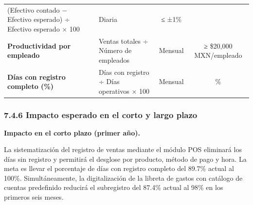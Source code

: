 \documentclass[
  12pt,
  spanish,
]{article}
\begin{document}
\begin{longtable}[]{@{}llcc@{}}
\begin{minipage}[t]{0.17\columnwidth}
(Efectivo contado − Efectivo esperado) ÷ Efectivo esperado × 100\strut
\end{minipage} & \begin{minipage}[t]{0.28\columnwidth}\centering
Diaria\strut
\end{minipage} & \begin{minipage}[t]{0.28\columnwidth}\centering
≤ ±1\%\strut
\end{minipage}\tabularnewline
\begin{minipage}[t]{0.17\columnwidth}\raggedright
\textbf{Productividad por empleado}\strut
\end{minipage} & \begin{minipage}[t]{0.17\columnwidth}\raggedright
Ventas totales ÷ Número de empleados\strut
\end{minipage} & \begin{minipage}[t]{0.28\columnwidth}\centering
Mensual\strut
\end{minipage} & \begin{minipage}[t]{0.28\columnwidth}\centering
≥ \$20,000 MXN/empleado\strut
\end{minipage}\tabularnewline
\begin{minipage}[t]{0.17\columnwidth}\raggedright
\textbf{Días con registro completo (\%)}\strut
\end{minipage} & \begin{minipage}[t]{0.17\columnwidth}\raggedright
Días con registro ÷ Días operativos × 100\strut
\end{minipage} & \begin{minipage}[t]{0.28\columnwidth}\centering
Mensual\strut
\end{minipage} & \begin{minipage}[t]{0.28\columnwidth}\centering
100\%\strut
\end{minipage}\tabularnewline
\bottomrule
\end{longtable}

\hypertarget{impacto-esperado-en-el-corto-y-largo-plazo}{%
\subsubsection{7.4.6 Impacto esperado en el corto y largo
plazo}\label{impacto-esperado-en-el-corto-y-largo-plazo}}

\textbf{Impacto en el corto plazo (primer año).}

La sistematización del registro de ventas mediante el módulo POS
eliminará los días sin registro y permitirá el desglose por producto,
método de pago y hora. La meta es llevar el porcentaje de días con
registro completo del 89.7\% actual al 100\%. Simultáneamente, la
digitalización de la libreta de gastos con catálogo de cuentas
predefinido reducirá el subregistro del 87.4\% actual al 98\% en los
primeros seis meses.
\end{document}
